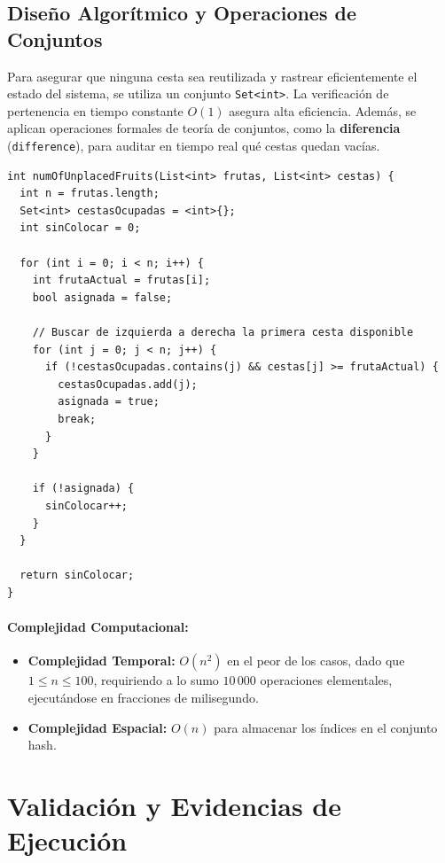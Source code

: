 \documentclass[12pt,a4paper]{article}
\begin{document}
\subsection{Diseño Algorítmico y Operaciones de Conjuntos}
Para asegurar que ninguna cesta sea reutilizada y rastrear eficientemente el estado del sistema, se utiliza un conjunto \texttt{Set<int>}. La verificación de pertenencia en tiempo constante $O(1)$ asegura alta eficiencia. Además, se aplican operaciones formales de teoría de conjuntos, como la \textbf{diferencia} (\texttt{difference}), para auditar en tiempo real qué cestas quedan vacías.

\begin{lstlisting}[caption={Solución al Ejercicio 3 utilizando Set en Dart}]
int numOfUnplacedFruits(List<int> frutas, List<int> cestas) {
  int n = frutas.length;
  Set<int> cestasOcupadas = <int>{};
  int sinColocar = 0;

  for (int i = 0; i < n; i++) {
    int frutaActual = frutas[i];
    bool asignada = false;

    // Buscar de izquierda a derecha la primera cesta disponible
    for (int j = 0; j < n; j++) {
      if (!cestasOcupadas.contains(j) && cestas[j] >= frutaActual) {
        cestasOcupadas.add(j);
        asignada = true;
        break;
      }
    }

    if (!asignada) {
      sinColocar++;
    }
  }

  return sinColocar;
}
\end{lstlisting}

\paragraph{Complejidad Computacional:}
\begin{itemize}
    \item \textbf{Complejidad Temporal:} $O(n^2)$ en el peor de los casos, dado que $1 \le n \le 100$, requiriendo a lo sumo $10\,000$ operaciones elementales, ejecutándose en fracciones de milisegundo.
    \item \textbf{Complejidad Espacial:} $O(n)$ para almacenar los índices en el conjunto hash.
\end{itemize}

\section{Validación y Evidencias de Ejecución}
\end{document}
